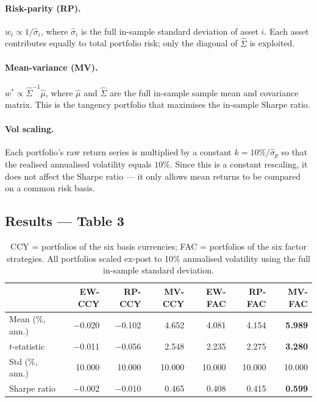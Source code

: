 \documentclass[a4paper,12pt]{article}
\begin{document}
\paragraph{Risk-parity (RP).}
$w_i \propto 1/\hat{\sigma}_i$, where $\hat{\sigma}_i$ is the full in-sample standard
deviation of asset $i$. Each asset contributes equally to total portfolio risk; only the
diagonal of $\hat{\Sigma}$ is exploited.

\paragraph{Mean-variance (MV).}
$w^{*} \propto \hat{\Sigma}^{-1}\hat{\mu}$, where $\hat{\mu}$ and $\hat{\Sigma}$ are the
full in-sample sample mean and covariance matrix. This is the tangency portfolio that
maximises the in-sample Sharpe ratio.

\paragraph{Vol scaling.}
Each portfolio's raw return series is multiplied by a constant $k = 10\% / \hat{\sigma}_p$
so that the realised annualised volatility equals $10\%$. Since this is a constant
rescaling, it does not affect the Sharpe ratio --- it only allows mean returns to be
compared on a common risk basis.

\subsection{Results --- Table 3}

\begin{table}[H]
\centering
\caption{In-sample Portfolios --- Performance Statistics (Jan 1995 -- Dec 2024, scaled to 10\% vol)}
\label{tab:table3}
\renewcommand{\arraystretch}{1.3}
\begin{tabular}{lrrrrrr}
\toprule
 & \textbf{EW-CCY} & \textbf{RP-CCY} & \textbf{MV-CCY} & \textbf{EW-FAC} & \textbf{RP-FAC} & \textbf{MV-FAC} \\
\midrule
Mean (\%, ann.)  & $-$0.020 & $-$0.102 & 4.652 & 4.081 & 4.154 & \textbf{5.989} \\
$t$-statistic    & $-$0.011 & $-$0.056 & 2.548 & 2.235 & 2.275 & \textbf{3.280} \\
Std (\%, ann.)   & 10.000   & 10.000   & 10.000 & 10.000 & 10.000 & 10.000 \\
Sharpe ratio     & $-$0.002 & $-$0.010 & 0.465 & 0.408 & 0.415 & \textbf{0.599} \\
\bottomrule
\end{tabular}
\caption*{\footnotesize CCY = portfolios of the six basis currencies; FAC = portfolios of the
six factor strategies. All portfolios scaled ex-post to 10\% annualised volatility using
the full in-sample standard deviation.}
\end{table}
\end{document}
